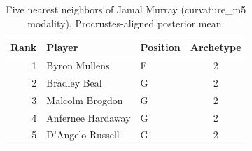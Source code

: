 \begin{table}[htbp]
  \centering\small
  \begin{tabular}{rllc}
    \toprule
    Rank & Player & Position & Archetype \\
    \midrule
    1 & Byron Mullens & F & 2 \\
    2 & Bradley Beal & G & 2 \\
    3 & Malcolm Brogdon & G & 2 \\
    4 & Anfernee Hardaway & G & 2 \\
    5 & D'Angelo Russell & G & 2 \\
    \bottomrule
  \end{tabular}
  \caption{Five nearest neighbors of Jamal Murray (curvature_m5 modality), Procrustes-aligned posterior mean.}
  \label{tab:Jamal_Murray_neighbors_curvature_m5}
\end{table}

